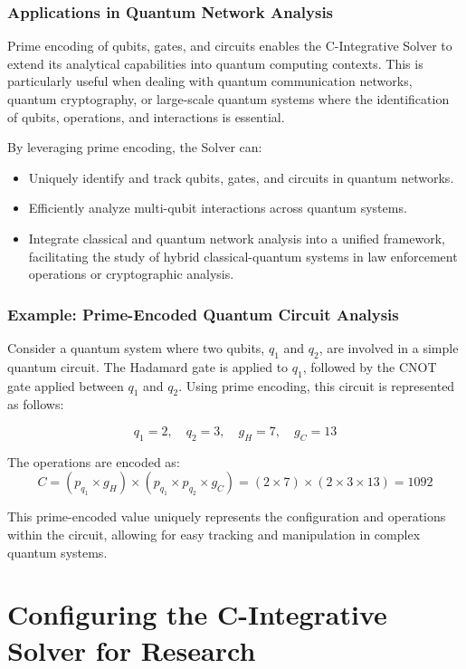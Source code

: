 \documentclass[%
 preprint, linenumbers,
 amsmath,amssymb,
 aps, physrev,
]{revtex4-2}
\begin{document}
\subsubsection{Applications in Quantum Network Analysis}

Prime encoding of qubits, gates, and circuits enables the C-Integrative Solver to extend its analytical capabilities into quantum computing contexts. This is particularly useful when dealing with quantum communication networks, quantum cryptography, or large-scale quantum systems where the identification of qubits, operations, and interactions is essential.

By leveraging prime encoding, the Solver can:
\begin{itemize}
    \item Uniquely identify and track qubits, gates, and circuits in quantum networks.
    \item Efficiently analyze multi-qubit interactions across quantum systems.
    \item Integrate classical and quantum network analysis into a unified framework, facilitating the study of hybrid classical-quantum systems in law enforcement operations or cryptographic analysis.
\end{itemize}

\subsubsection{Example: Prime-Encoded Quantum Circuit Analysis}

Consider a quantum system where two qubits, \( q_1 \) and \( q_2 \), are involved in a simple quantum circuit. The Hadamard gate is applied to \( q_1 \), followed by the CNOT gate applied between \( q_1 \) and \( q_2 \). Using prime encoding, this circuit is represented as follows:

\[
q_1 = 2, \quad q_2 = 3, \quad g_H = 7, \quad g_C = 13
\]

The operations are encoded as:
\[
C = (p_{q_1} \times g_H) \times (p_{q_1} \times p_{q_2} \times g_C) = (2 \times 7) \times (2 \times 3 \times 13) = 1092
\]

This prime-encoded value uniquely represents the configuration and operations within the circuit, allowing for easy tracking and manipulation in complex quantum systems.

\section{Configuring the C-Integrative Solver for Research}
\end{document}
